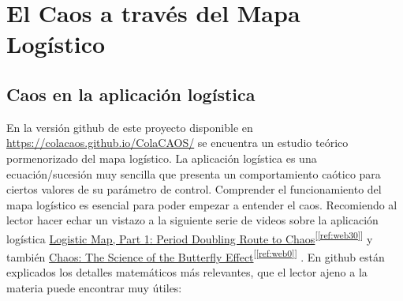 \documentclass[
  10pt,
  a4paper,
  DIV=11,
  numbers=noendperiod,
  open=any]{scrreprt}
\numberwithin{equation}{chapter}
\numberwithin{equation}{section}
\renewcommand{\[}{\begin{equation}}
\renewcommand{\]}{\end{equation}}
\newcommand{\refweb}[3]{%
  \href{#1}{#2}\textsuperscript{[\ref{ref:#3}]}%
}
\begin{document}
\part{El Caos a través del Mapa Logístico}


\chapter{Caos en la aplicación logística}\label{caos}

En la versión github de este proyecto disponible en \href{https://colacaos.github.io/ColaCAOS/}{https://colacaos.github.io/ColaCAOS/} se encuentra un estudio teórico pormenorizado del mapa logístico. La aplicación logística es una ecuación/sucesión muy sencilla que presenta un comportamiento caótico para ciertos valores de su parámetro de control. Comprender el funcionamiento del mapa logístico es esencial para poder empezar a entender el caos. Recomiendo al lector hacer echar un vistazo a la siguiente serie de videos sobre la aplicación logística \refweb{https://www.youtube.com/watch?v=PVo1mHnU7WU&t=32s}{Logistic Map, Part 1: Period Doubling Route to Chaos}{web30} y también \refweb{https://www.youtube.com/watch?v=fDek6cYijxI}{Chaos: The Science of the Butterfly Effect}{web0} . En github están explicados los detalles matemáticos más relevantes, que el lector ajeno a la materia puede encontrar muy útiles:
\end{document}
